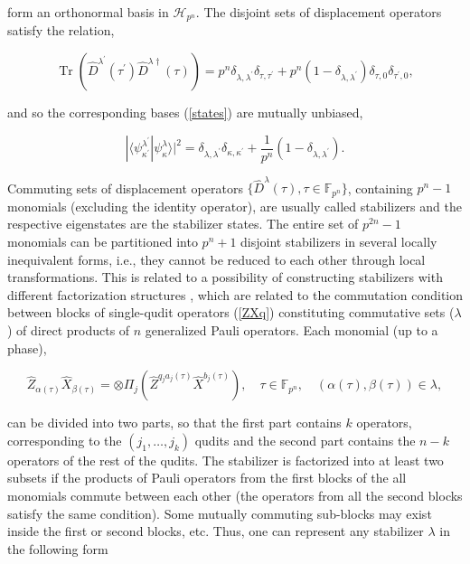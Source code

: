 \documentclass[quantumrep,article,submit,pdftex,moreauthors]{Definitions/mdpi}
\DeclareMathOperator{\Tr}{Tr}
\begin{document}
form an orthonormal basis in $\mathcal{H}_{p^{n}}$. The disjoint sets of
displacement operators satisfy the relation,%

\begin{equation*}
  \Tr\left(
    \hat{D}^{\lambda^{\prime}}(\tau^{\prime})\hat{D}^{\lambda\dagger}(\tau)
  \right)
  = p^{n}\delta_{\lambda,\lambda^{\prime}}\delta_{\tau,\tau^{\prime }} +
  p^{n}(1 - \delta_{\lambda,\lambda^{\prime}}) \delta_{\tau,0}
  \delta_{\tau^{\prime},0},
\end{equation*}

and so the corresponding bases (\ref{states}) are mutually unbiased,

\begin{equation}
  |\langle\psi_{\kappa^{\prime}}^{\lambda^{\prime}}
  |\psi_{\kappa}^{\lambda}\rangle|^{2}
  = \delta_{\lambda,\lambda^{\prime}} \delta_{\kappa,\kappa^{\prime}} +
  \frac{1}{p^{n}} (1-\delta_{\lambda,\lambda^{\prime}}).
  \label{UB}
\end{equation}

Commuting sets of displacement operators $\{\hat{D}^{\lambda }(\tau ),\tau
\in \mathbb{F}_{p^{n}}\}$, containing $p^{n}-1$ monomials (excluding the
identity operator), are usually called stabilizers and the respective
eigenstates are the stabilizer states. The entire set of $p^{2n}-1$
monomials can be partitioned into $p^{n}+1$ disjoint stabilizers in several
locally inequivalent forms, i.e., they cannot be reduced to each other
through local transformations. This is related to a possibility of
constructing stabilizers with different factorization structures
\cite{factor1,factor2}, which are related to the commutation condition between
blocks of single-qudit operators (\ref{ZXq}) constituting commutative sets ($%
\lambda $) of direct products of $n$ generalized Pauli operators. Each
monomial (up to a phase), 

\begin{equation*}
  \hat{Z}_{\alpha(\tau)}\hat{X}_{\beta(\tau)}
  = \otimes \Pi_{j}\left(
    \hat{Z}^{q_{j}a_{j}(\tau)}\hat{X}^{b_{j}(\tau)}
  \right),
  \quad \tau \in \mathbb{F}_{p^{n}},
  \quad \left(\alpha(\tau),\beta(\tau)\right)
  \in \lambda,
\end{equation*}

can be divided into two parts, so that the first part contains $k$
operators, corresponding to the $(j_{1},\ldots ,j_{k})$ qudits and the
second part contains the $n-k$ operators of the rest of the qudits. The
stabilizer is factorized into at least two subsets if the products of Pauli
operators from the first blocks of the all monomials commute between each other
(the operators from all the second blocks satisfy the same condition). Some
mutually commuting sub-blocks may exist inside the first or second blocks, etc.
Thus, one can represent any stabilizer $\lambda $ in the following form 
\end{document}
